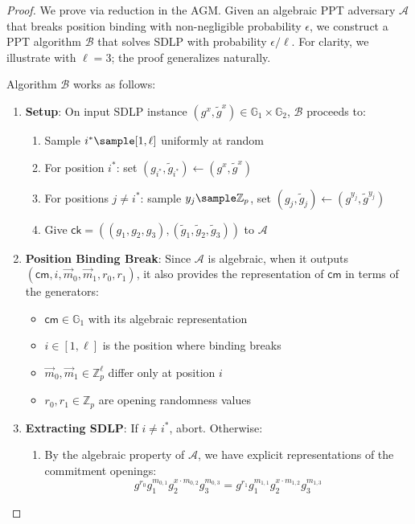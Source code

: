 \begin{proof}
We prove via reduction in the AGM. Given an algebraic PPT adversary $\mathcal{A}$ that breaks position binding with non-negligible probability $\epsilon$, we construct a PPT algorithm $\mathcal{B}$ that solves SDLP with probability $\epsilon/\ell$. For clarity, we illustrate with $\ell = 3$; the proof generalizes naturally.

Algorithm $\mathcal{B}$ works as follows:
\begin{enumerate}
    \item \textbf{Setup}: On input SDLP instance $(g^x, \tilde{g}^x) \in \mathbb{G}_1 \times \mathbb{G}_2$, $\mathcal{B}$ proceeds to:
    \begin{enumerate}
        \item Sample $i^* \sample [1,\ell]$ uniformly at random
        \item For position $i^*$: set $(g_{i^*}, \tilde{g}_{i^*}) \gets (g^x, \tilde{g}^x)$
        \item For positions $j \neq i^*$: sample $y_j \sample \mathbb{Z}_p$, set $(g_j, \tilde{g}_j) \gets (g^{y_j}, \tilde{g}^{y_j})$
        \item Give $\mathsf{ck} = ((g_1, g_2, g_3), (\tilde{g}_1, \tilde{g}_2, \tilde{g}_3))$ to $\mathcal{A}$
    \end{enumerate}
    
    \item \textbf{Position Binding Break}: Since $\mathcal{A}$ is algebraic, when it outputs $(\mathsf{cm}, i, \vec{m}_0, \vec{m}_1, r_0, r_1)$, it also provides the representation of $\mathsf{cm}$ in terms of the generators:
    \begin{itemize}
        \item $\mathsf{cm} \in \mathbb{G}_1$ with its algebraic representation
        \item $i \in [1,\ell]$ is the position where binding breaks
        \item $\vec{m}_0, \vec{m}_1 \in \mathbb{Z}_p^\ell$ differ only at position $i$
        \item $r_0, r_1 \in \mathbb{Z}_p$ are opening randomness values
    \end{itemize}
    
    \item \textbf{Extracting SDLP}: If $i \neq i^*$, abort. Otherwise:
    \begin{enumerate}
        \item By the algebraic property of $\mathcal{A}$, we have explicit representations of the commitment openings:
        \[
            g^{r_0}g_1^{m_{0,1}}g_2^{x \cdot m_{0,2}}g_3^{m_{0,3}} = g^{r_1}g_1^{m_{1,1}}g_2^{x \cdot m_{1,2}}g_3^{m_{1,3}}
        \]
        

\end{enumerate}
\end{enumerate}
\end{proof}
